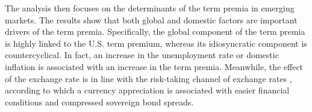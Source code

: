 {The analysis then focuses on the determinants of the term premia in emerging markets. The results show that both global and domestic factors are important drivers of the term premia. 
Specifically, the global component of the term premia is highly linked to the U.S. term premium, whereas its idiosyncratic component is countercyclical. 
In fact, an increase in the unemployment rate or domestic inflation 
is associated with an increase in the term premia. Meanwhile, the effect of the exchange rate is in line with the risk-taking channel of exchange rates \citep*{HofmannShimShin:2019}, according to which a currency appreciation is associated with easier financial conditions and compressed sovereign bond spreads.




}

